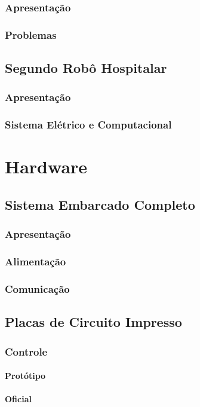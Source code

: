 \documentclass[]{politex}
\begin{document}
\section{Apresentação}
\section{Problemas}
\chapter{Segundo Robô Hospitalar}
\section{Apresentação}
\section{Sistema Elétrico e Computacional}

\part{Hardware}
\chapter{Sistema Embarcado Completo}
\section{Apresentação}
\section{Alimentação}
\section{Comunicação}

\chapter{Placas de Circuito Impresso}
\section{Controle}
\subsection{Protótipo}
\subsection{Oficial}
\end{document}

